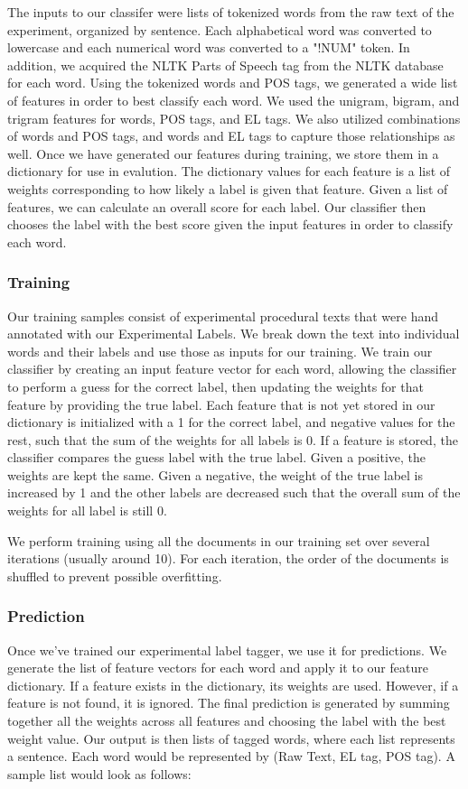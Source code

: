 The inputs to our classifer were lists of tokenized words from the raw text of the experiment, organized by sentence. Each alphabetical word was converted to lowercase and each numerical word was converted to a "!NUM" token. In addition, we acquired the NLTK \cite{nltk} Parts of Speech tag from the NLTK database for each word. Using the tokenized words and POS tags, we generated a wide list of features in order to best classify each word. We used the unigram, bigram, and trigram features for words, POS tags, and EL tags. We also utilized combinations of words and POS tags, and words and EL tags to capture those relationships as well. Once we have generated our features during training, we store them in a dictionary for use in evalution. The dictionary values for each feature is a list of weights corresponding to how likely a label is given that feature. Given a list of features, we can calculate an overall score for each label. Our classifier then chooses the label with the best score given the input features in order to classify each word. 

\subsubsection{Training}
Our training samples consist of experimental procedural texts that were hand annotated with our Experimental Labels. We break down the text into individual words and their labels and use those as inputs for our training. We train our classifier by creating an input feature vector for each word, allowing the classifier to perform a guess for the correct label, then updating the weights for that feature by providing the true label. Each feature that is not yet stored in our dictionary is initialized with a 1 for the correct label, and negative values for the rest, such that the sum of the weights for all labels is 0. If a feature is stored, the classifier compares the guess label with the true label. Given a positive, the weights are kept the same. Given a negative, the weight of the true label is increased by 1 and the other labels are decreased such that the overall sum of the weights for all label is still 0. 

We perform training using all the documents in our training set over several iterations (usually around 10). For each iteration, the order of the documents is shuffled to prevent possible overfitting. 

\subsubsection{Prediction}
Once we've trained our experimental label tagger, we use it for predictions. We generate the list of feature vectors for each word and apply it to our feature dictionary. If a feature exists in the dictionary, its weights are used. However, if a feature is not found, it is ignored. The final prediction is generated by summing together all the weights across all features and choosing the label with the best weight value. Our output is then lists of tagged words, where each list represents a sentence. Each word would be represented by (Raw Text, EL tag, POS tag). A sample list would look as follows:

